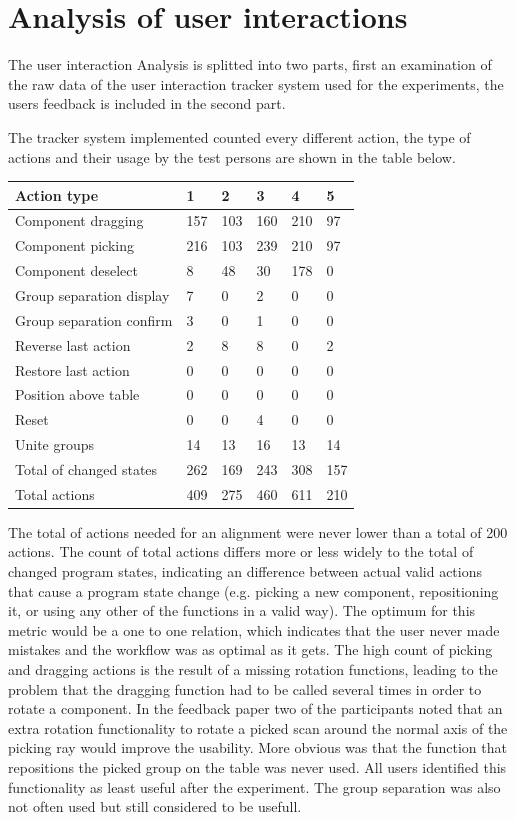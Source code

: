 \documentclass[hyperref,english,bachelorofscience,bibnum,twoside]{cgvpub}
\begin{document}
\section{Analysis of user interactions}

The user interaction Analysis is splitted into two parts, first an examination of the raw data of the user interaction tracker system used for the experiments, the users feedback is included in the second part.

The tracker system implemented counted every different action, the type of actions and their usage by the test persons are shown in the table below.

\begin{table}[!h]
\begin{tabular}{|l|l|l|l|l|l|} \hline
Action type & 1 & 2 & 3 & 4 & 5 \\ \hline
Component dragging & 157 & 103 & 160 & 210 & 97\\
Component picking & 216 & 103 & 239 & 210 & 97\\
Component deselect & 8 & 48 & 30 & 178 & 0\\
Group separation display & 7 & 0 & 2 & 0 & 0\\
Group separation confirm & 3 & 0 & 1 & 0 & 0\\
Reverse last action & 2 & 8 & 8 & 0 & 2\\
Restore last action & 0 & 0 & 0 & 0 & 0\\
Position above table & 0 & 0 & 0 & 0 & 0\\
Reset & 0 & 0 & 4 & 0 & 0\\
Unite groups & 14 & 13 & 16 & 13 & 14\\
Total of changed states & 262 & 169 & 243 & 308 & 157\\ 
Total actions & 409 & 275 & 460 & 611 & 210\\
\hline
\end{tabular}
\end{table}
The total of actions needed for an alignment were never lower than a total of 200 actions. The count of total actions differs more or less widely to the total of changed program states, indicating an difference between actual valid actions that cause a program state change (e.g. picking a new component, repositioning it, or using any other of the functions in a valid way). The optimum for this metric would be a one to one relation, which indicates that the user never made mistakes and the workflow was as optimal as it gets. The high count of picking and dragging actions is the result of a missing rotation functions, leading to the problem that the dragging function had to be called several times in order to rotate a component. In the feedback paper two of the participants noted that an extra rotation functionality to rotate a picked scan around the normal axis of the picking ray would improve the usability. More obvious was that the function that repositions the picked group on the table was never used. All users identified this functionality as least useful after the experiment. The group separation was also not often used but still considered to be usefull.
\end{document}
